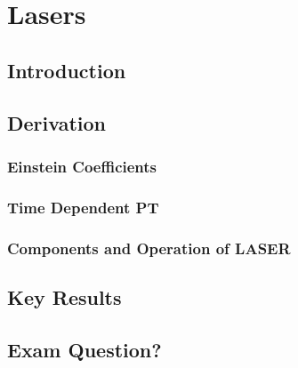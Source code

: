\chapter{Lasers}
\label{chapt8}

\section{Introduction}

\section{Derivation}

\subsection{Einstein Coefficients}

\subsection{Time Dependent PT}

\subsection{Components and Operation of LASER}

\section{Key Results}

\section{Exam Question?}
